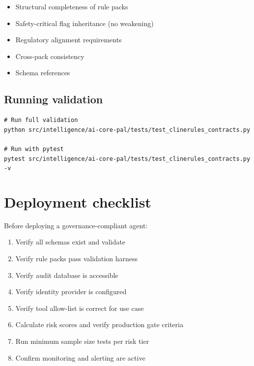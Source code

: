 \begin{itemize}
  \item Structural completeness of rule packs
  \item Safety-critical flag inheritance (no weakening)
  \item Regulatory alignment requirements
  \item Cross-pack consistency
  \item Schema references
\end{itemize}

\subsection{Running validation}

\begin{verbatim}
# Run full validation
python src/intelligence/ai-core-pal/tests/test_clinerules_contracts.py

# Run with pytest
pytest src/intelligence/ai-core-pal/tests/test_clinerules_contracts.py -v
\end{verbatim}

\section{Deployment checklist}

Before deploying a governance-compliant agent:

\begin{enumerate}
  \item Verify all schemas exist and validate
  \item Verify rule packs pass validation harness
  \item Verify audit database is accessible
  \item Verify identity provider is configured
  \item Verify tool allow-list is correct for use case
  \item Calculate risk scores and verify production gate criteria
  \item Run minimum sample size tests per risk tier
  \item Confirm monitoring and alerting are active
\end{enumerate}